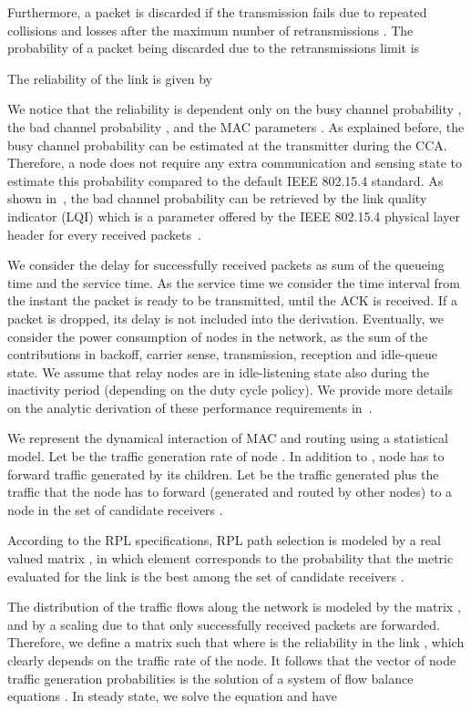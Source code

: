 \documentclass[review, 1p, 11pt]{elsarticle}
\numberwithin{equation}{section}
\begin{document}
Furthermore, a packet is discarded if the transmission
fails due to repeated collisions and losses after the maximum number of retransmissions .
The probability of a packet being discarded due to the retransmissions limit is


The reliability of the link  is given by

We notice that the reliability is dependent only on the busy channel probability , the bad channel probability , and the MAC parameters .
As explained before, the busy channel probability  can be estimated at the transmitter during the CCA.
Therefore, a node does not require any extra communication and sensing state to estimate this probability compared to the default IEEE 802.15.4 standard.
As shown in~\cite{gomez}, the bad channel probability  can be retrieved by the link quality indicator (LQI) which is a parameter offered by the IEEE 802.15.4 physical layer header for every received packets~\cite{ieee802154}.

We consider the delay for
successfully received packets as sum of the queueing time and
the service time. As the service time we consider the time interval from the
instant the packet is ready to be transmitted, until the ACK is received. If a packet is dropped,
its delay is not included into the derivation.
Eventually, we consider the power
consumption of nodes in the network, as the sum of the contributions in backoff, carrier sense,
transmission, reception and idle-queue state. We assume that relay
nodes are in idle-listening state also during the inactivity
period (depending on the duty cycle policy).
We provide more details on the analytic derivation of these performance requirements in~\cite{PG_TVT}.

We represent the dynamical interaction of MAC and routing
using a statistical model.  Let  be the
traffic generation rate of node . In addition to , node  has to forward
traffic generated by its children.
Let  be the traffic generated plus the traffic that the node has to
forward (generated and routed by other nodes) to a node in the set of candidate receivers .



According to the RPL specifications, RPL path selection is modeled by a real valued matrix
, in which element  corresponds to the
probability that the metric  evaluated for the link  is the
best among the set of candidate receivers .




The distribution of the traffic flows along the network is modeled
by the matrix , and by a scaling due to that only
successfully received packets are forwarded. Therefore, we define
a matrix  such that  where
 is the reliability in the link , which clearly
depends on the traffic rate of the node. It follows that the vector
of node traffic generation probabilities  is the solution of a
system of flow balance equations . In steady state, we solve the equation and have
\end{document}
